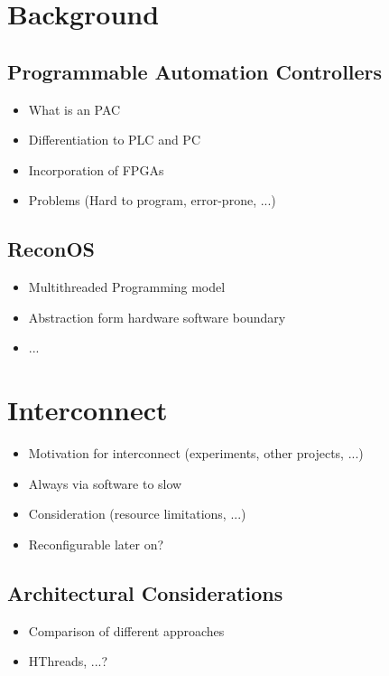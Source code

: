 \documentclass[
	a4paper,
	12pt,
	twoside,
	DIV=10,
	abstracton,
	parskip,
	listof=totoc,
	bibliography=totoc]{scrreprt}
\begin{document}
\tableofcontents
\listoffigures
\listoftables

\cleardoublepage



\chapter{Background}
\section{Programmable Automation Controllers}
\begin{itemize}
\item What is an PAC
\item Differentiation to PLC and PC
\item Incorporation of FPGAs
\item Problems (Hard to program, error-prone, ...)
\end{itemize}
\section{ReconOS}
\begin{itemize}
\item Multithreaded Programming model
\item Abstraction form hardware software boundary
\item ...
\end{itemize}

\chapter{Interconnect}
\begin{itemize}
\item Motivation for interconnect (experiments, other projects, ...)
\item Always via software to slow
\item Consideration (resource limitations, ...)
\item Reconfigurable later on?
\end{itemize}
\section{Architectural Considerations}
\begin{itemize}
\item Comparison of different approaches
\item HThreads, ...?
\end{itemize}
\end{document}
